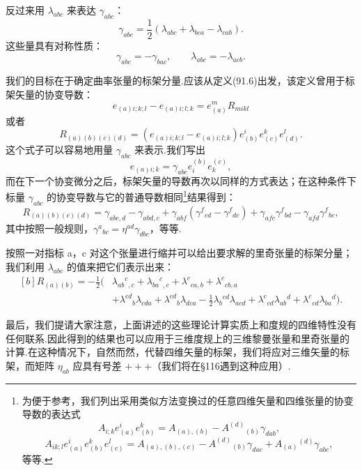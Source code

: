反过来用 $\lambda_{abc}$ 来表达 $\gamma_{abc}$：
\begin{equation}
  \gamma_{abc}=\frac{1}{2}\left(\lambda_{abc}+\lambda_{bca}
  -\lambda_{cab}\right).
\end{equation}
这些量具有对称性质：
\begin{equation}
  \gamma_{abc}=-\gamma_{bac},\qquad
  \lambda_{abc}=-\lambda_{acb}.
\end{equation}

我们的目标在于确定曲率张量的标架分量.应该从定义(91.6)出发，该定义曾用于标架矢量的协变导数：
\begin{equation*}
  e_{(a)i;k;l}-e_{(a)i;l;k}=e^m_{(a)}R_{mikl}
\end{equation*}
或者
\begin{equation*}
  R_{(a)(b)(c)(d)}
  =\left(e_{(a)i;k;l}-e_{(a)i;l;k}\right)
  e^i_{(b)}e^k_{(c)}e^l_{(d)}.
\end{equation*}
这个式子可以容易地用量 $\gamma_{abc}$ 来表示.我们写出
\begin{equation*}
  e_{(a)i;k}=\gamma_{abc}e^{(b)}_ie^{(c)}_k,
\end{equation*}
而在下一个协变微分之后，标架矢量的导数再次以同样的方式表达；在这种条件下标量 $\gamma_{abc}$ 的协变导数与它的普通导数相同\footnote{为便于参考，我们列出采用类似方法变换过的任意四维矢量和四维张量的协变导数的表达式
\begin{equation*}
  A_{i;k}e^i_{(a)}e^k_{(b)}=A_{(a),(b)}-A^{(d)}{}_{(b)}\gamma_{dab},
\end{equation*}
\begin{equation*}
  A_{ik;l}e^i_{(a)}e^k_{(b)}e^l_{(c)}
  =A_{(a),(b),(c)}-A^{(d)}{}_{(b)}\gamma_{dac}+A_{(a)}{}^{(d)}\gamma_{abc},
\end{equation*}
等等.}结果得到：
\begin{equation}
  R_{(a)(b)(c)(d)}=\gamma_{abc,d}-\gamma_{abd,c}
  +\gamma_{abf}\left(\gamma^f{}_{cd}-\gamma^f{}_{dc}\right)
  +\gamma_{afc}\gamma^f{}_{bd}
  -\gamma_{afd}\gamma^f{}_{bc},
\end{equation}
其中按照一般规则，$\gamma^a{}_{bc}=\eta^{ad}\gamma_{dbc}$，等等.

按照一对指标 a，c 对这个张量进行缩并可以给出要求解的里奇张量的标架分量；我们利用 $\lambda_{abc}$ 的值来把它们表示出来：
\begin{equation}
\begin{aligned}[b]
  R_{(a)(b)}=-\frac{1}{2}\bigl(&\lambda_{ab}{}^{c}{}_{,c}
  +\lambda_{ba}{}^{c}{}_{,c}
  +\lambda^{c}{}_{ca,b}
  +\lambda^{c}{}_{cb,a}\\
  &+\lambda^{cd}{}_{b}\lambda_{cda}
  +\lambda^{cd}{}_{b}\lambda_{dca}
  -\frac{1}{2}\lambda_{b}{}^{cd}\lambda_{acd}
  +\lambda^{c}{}_{cd}\lambda_{ab}{}^{d}
  +\lambda^{c}{}_{cd}\lambda_{ba}{}^{d}\bigr).
\end{aligned}
\end{equation}

最后，我们提请大家注意，上面讲述的这些理论计算实质上和度规的四维特性没有任何联系.因此得到的结果也可以应用于三维度规上的三维黎曼张量和里奇张量的计算.在这种情况下，自然而然，代替四维矢量的标架，我们将应对三维矢量的标架，而矩阵 $\eta_{ab}$ 应具有号差 $+++$（我们将在§116遇到这种应用）.
